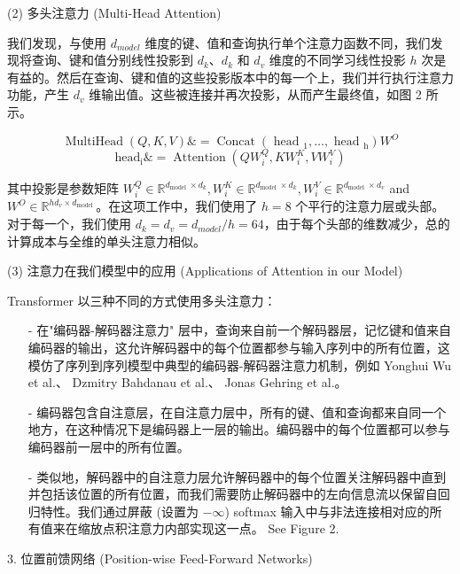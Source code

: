 (2) 多头注意力 (Multi-Head Attention)

我们发现，与使用 $d_{model}$ 维度的键、值和查询执行单个注意力函数不同，我们发现将查询、键和值分别线性投影到 $d_{k}$、$d_{k}$ 和 $d_{v}$ 维度的不同学习线性投影 $h$ 次是有益的。然后在查询、键和值的这些投影版本中的每一个上，我们并行执行注意力功能，产生 $d_{v}$ 维输出值。这些被连接并再次投影，从而产生最终值，如图 2 所示。

$$\operatorname{MultiHead}(Q, K, V) \&=\operatorname{Concat}\left(\text { head }_{1}, \ldots, \text { head }_{\mathrm{h}}\right) W^{O} $$
\begin{equation}
\text {head}_{\mathrm{i}} \&=\operatorname{Attention}\left(Q W_{i}^{Q}, K W_{i}^{K}, V W_{i}^{V}\right)
\end{equation}

其中投影是参数矩阵 $W_{i}^{Q} \in \mathbb{R}^{d_{\text {model }} \times d_{k}}, W_{i}^{K} \in \mathbb{R}^{d_{\text {model }} \times d_{k}}, W_{i}^{V} \in \mathbb{R}^{d_{\text {model }} \times d_{v}}$ and $W^{O} \in \mathbb{R}^{h d_{v} \times d_{\text {model }}}$。在这项工作中，我们使用了 $h = 8$ 个平行的注意力层或头部。对于每一个，我们使用 $d_{k} = d_{v} = d_{model}/h = 64$，由于每个头部的维数减少，总的计算成本与全维的单头注意力相似。


(3) 注意力在我们模型中的应用 (Applications of Attention in our Model)

Transformer 以三种不同的方式使用多头注意力：

\begin{itemize}
\item [-] 在"编码器-解码器注意力" 层中，查询来自前一个解码器层，记忆键和值来自编码器的输出，这允许解码器中的每个位置都参与输入序列中的所有位置，这模仿了序列到序列模型中典型的编码器-解码器注意力机制，例如 Yonghui Wu et al.、 Dzmitry Bahdanau et al.、 Jonas Gehring et al.。

\item [-] 编码器包含自注意层，在自注意力层中，所有的键、值和查询都来自同一个地方，在这种情况下是编码器上一层的输出。编码器中的每个位置都可以参与编码器前一层中的所有位置。

\item [-] 类似地，解码器中的自注意力层允许解码器中的每个位置关注解码器中直到并包括该位置的所有位置，而我们需要防止解码器中的左向信息流以保留自回归特性。我们通过屏蔽 (设置为 $-\infty$) softmax 输入中与非法连接相对应的所有值来在缩放点积注意力内部实现这一点。 See Figure 2.
\end{itemize}

3. 位置前馈网络 (Position-wise Feed-Forward Networks)

